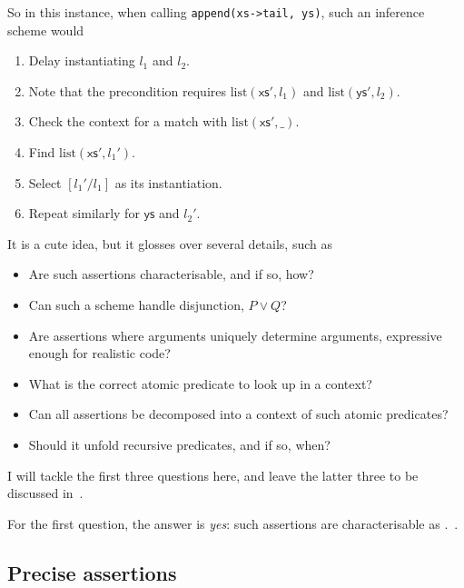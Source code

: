 So in this instance, when calling \texttt{append(xs->tail, ys)}, %
such an inference scheme would
\begin{enumerate}
    \item Delay instantiating $l_1$ and $l_2$.
    \item Note that the precondition requires $\mathrm{list}(\mathsf{xs}',
        l_1)$ and $\mathrm{list}(\mathsf{ys}', l_2)$.
    \item Check the context for a match with $\mathrm{list}(\mathsf{xs}',
        \_)$.
    \item Find $\mathrm{list}(\mathsf{xs}', l_1')$.
    \item Select $[l_1' / l_1]$ as its instantiation.
    \item Repeat similarly for $\mathsf{ys}$ and $l_2'$.
\end{enumerate}

It is a cute idea, but it glosses over several details, such as
\begin{itemize}
    \item Are such assertions characterisable, and if so, how?
    \item Can such a scheme handle disjunction, $ P \vee{} Q$?
    \item Are assertions where  arguments uniquely determine
         arguments, expressive enough for realistic code?
    \item What is the correct atomic predicate to look up in a context?
    \item Can all assertions be decomposed into a context of such atomic
        predicates?
    \item Should it unfold recursive predicates, and if so, when?
\end{itemize}

I will tackle the first three questions here, and leave the latter three
to be discussed in~.

For the first question, the answer is \emph{yes}: such assertions are
characterisable as .~.

\subsection{Precise assertions}\label{subsec:precise-assertion}

